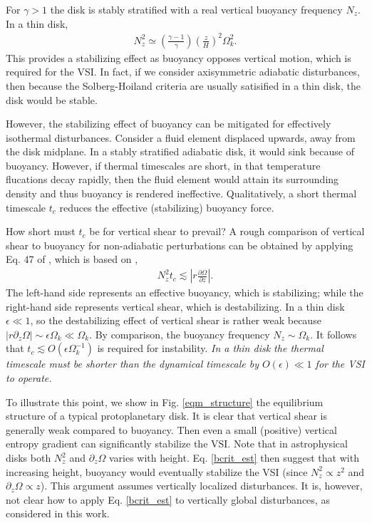 \documentclass[iop]{emulateapj}
\newcommand{\p}{\partial}
\begin{document}
For $\gamma>1$ the disk is stably stratified with a real vertical
buoyancy frequency $N_z$.  In a thin disk,     
\begin{align}\label{nz_thin}
  N_z^2 \simeq \left(\frac{\gamma-1}{\gamma}\right) \left(\frac{z}{H}\right)^2
  \Omega_k^2.  
\end{align}
This provides a stabilizing effect as buoyancy opposes vertical
motion, which is required for the VSI. In fact, if we consider
axisymmetric adiabatic disturbances, then because the 
Solberg-Hoiland criteria \citep{tassoul78} are usually satisified in a
thin disk, the disk would be stable. 

However, the stabilizing effect of buoyancy can be mitigated for 
effectively isothermal disturbances. Consider a fluid element displaced upwards, away from
the disk midplane. In a stably stratified adiabatic disk, it would
sink because of buoyancy. However, if thermal timescales are short, in
that temperature flucations decay rapidly, then the fluid element would attain its surrounding 
density and  
thus buoyancy is rendered ineffective. Qualitatively, a short thermal
timescale $t_c$ reduces the effective (stabilizing) buoyancy force.    

How short must $t_c$ be for vertical shear to prevail? A rough 
comparison of vertical shear to buoyancy for non-adiabatic
perturbations can be obtained by applying Eq. 47 of \cite{urpin03}, which is based on 
\cite{townsend58},   
\begin{align}\label{bcrit_est}
  N_z^2 t_c \lesssim \left|r\frac{\p\Omega}{\p z}\right|. 
\end{align}
The left-hand side represents an effective buoyancy, which is
stabilizing; while the right-hand side represents vertical shear,
which is destabilizing. In a thin disk $\epsilon \ll 1$, so the destabilizing effect of 
vertical shear is rather weak because $|r\p_z\Omega|\sim\epsilon\Omega_k
\ll \Omega_k$. By comparison, the buoyancy frequency $N_z\sim
\Omega_k$. It follows that $t_c\lesssim O(\epsilon\Omega_k^{-1})$ is
required for instability.  \emph{In a thin  
  disk the thermal timescale must be shorter than the dynamical
  timescale by $O(\epsilon)\ll 1$ for the VSI to operate.}   


To illustrate this point, we show in Fig. \ref{eqm_structure} the
equilibrium structure of a typical protoplanetary disk. %
It is
clear that vertical shear is 
generally weak compared to buoyancy. Then even a small (positive)
vertical entropy gradient can significantly stabilize the VSI. 
Note that in astrophysical disks both $N_z^2$ and $\p_z\Omega$ varies
with height. Eq. \ref{bcrit_est} then suggest that with
increasing height, buoyancy would eventually stabilize the VSI (since
$N_z^2\propto z^2$ and $\p_z\Omega\propto z$).
This argument assumes vertically localized disturbances. It is,
however, not clear how to apply Eq. \ref{bcrit_est} to vertically
global disturbances, as considered in this work.
\end{document}
